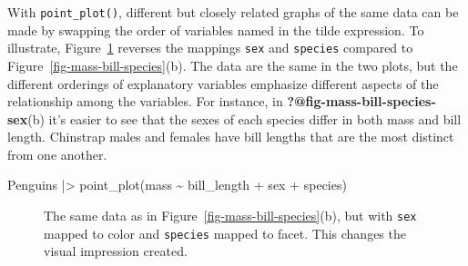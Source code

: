 \documentclass[
  letterpaper,
  DIV=11,
  numbers=noendperiod,
  oneside]{scrartcl}
\newenvironment{Shaded}{\begin{snugshade}}{\end{snugshade}}
\newcommand{\FunctionTok}[1]{\textcolor[rgb]{0.28,0.35,0.67}{#1}}
\newcommand{\NormalTok}[1]{\textcolor[rgb]{0.00,0.23,0.31}{#1}}
\newcommand{\SpecialCharTok}[1]{\textcolor[rgb]{0.37,0.37,0.37}{#1}}
\begin{document}
With \texttt{point\_plot()}, different but closely related graphs of the
same data can be made by swapping the order of variables named in the
tilde expression. To illustrate, Figure~\ref{fig-mass-bill-species-sex2}
reverses the mappings \texttt{sex} and \texttt{species} compared to
Figure~\ref{fig-mass-bill-species}(b). The data are the same in the two
plots, but the different orderings of explanatory variables emphasize
different aspects of the relationship among the variables. For instance,
in \textbf{?@fig-mass-bill-species-sex}(b) it's easier to see that the
sexes of each species differ in both mass and bill length. Chinstrap
males and females have bill lengths that are the most distinct from one
another.

\begin{Shaded}
\begin{Highlighting}[]
\NormalTok{Penguins }\SpecialCharTok{|\textgreater{}} \FunctionTok{point\_plot}\NormalTok{(mass }\SpecialCharTok{\textasciitilde{}}\NormalTok{ bill\_length }\SpecialCharTok{+}\NormalTok{ sex }\SpecialCharTok{+}\NormalTok{ species)}
\end{Highlighting}
\end{Shaded}

\begin{figure}[H]


\caption{\label{fig-mass-bill-species-sex2}The same data as in
Figure~\ref{fig-mass-bill-species}(b), but with \texttt{sex} mapped to
color and \texttt{species} mapped to facet. This changes the visual
impression created.}

\end{figure}%
\end{document}
